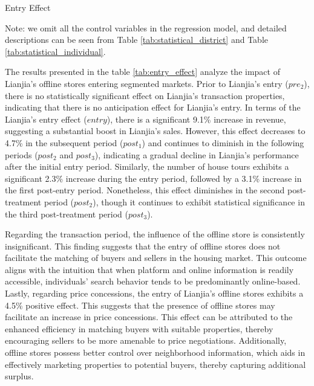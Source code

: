 \documentclass[11pt]{article}
\begin{document}
\begin{table}[htb!]
  \begin{center}
    \begin{scriptsize}
    \caption{Entry Effect}
    \label{tab:entry_effect}
      
    
    Note: we omit all the control variables in the regression model, and detailed descriptions can be seen from Table \ref{tab:statistical_district} and Table \ref{tab:statistical_individual}.
    \end{scriptsize}
  \end{center}
\end{table}

The results presented in the table \ref{tab:entry_effect} analyze the impact of Lianjia's offline stores entering segmented markets. Prior to Lianjia's entry ($pre_2$), there is no statistically significant effect on Lianjia's transaction properties, indicating that there is no anticipation effect for Lianjia's entry. In terms of the Lianjia's entry effect ($entry$), there is a significant 9.1\% increase in revenue, suggesting a substantial boost in Lianjia's sales. However, this effect decreases to 4.7\% in the subsequent period ($post_1$) and continues to diminish in the following periods ($post_2$ and $post_3$), indicating a gradual decline in Lianjia's performance after the initial entry period. Similarly, the number of house tours exhibits a significant 2.3\% increase during the entry period, followed by a 3.1\% increase in the first post-entry period. Nonetheless, this effect diminishes in the second post-treatment period ($post_2$), though it continues to exhibit statistical significance in the third post-treatment period ($post_3$). %

Regarding the transaction period, the influence of the offline store is consistently insignificant. This finding suggests that the entry of offline stores does not facilitate the matching of buyers and sellers in the housing market. This outcome aligns with the intuition that when platform and online information is readily accessible, individuals' search behavior tends to be predominantly online-based. Lastly, regarding price concessions, the entry of Lianjia's offline stores exhibits a 4.5\% positive effect. This suggests that the presence of offline stores may facilitate an increase in price concessions. This effect can be attributed to the enhanced efficiency in matching buyers with suitable properties, thereby encouraging sellers to be more amenable to price negotiations. Additionally, offline stores possess better control over neighborhood information, which aids in effectively marketing properties to potential buyers, thereby capturing additional surplus.
\end{document}
